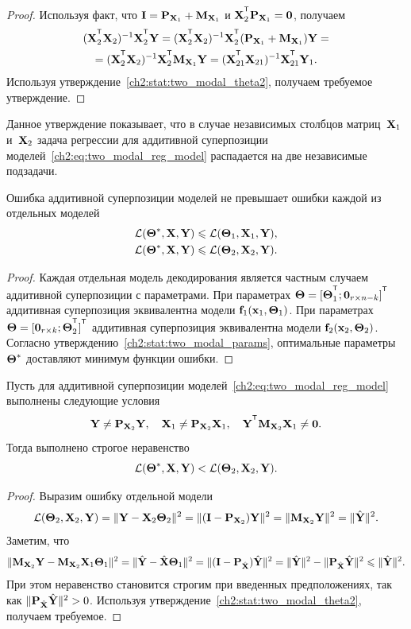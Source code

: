 \begin{proof}
	Используя факт, что $\mathbf{I} = \mathbf{P}_{\mathbf{X}_1} + \mathbf{M}_{\mathbf{X}_1}$ и $\bX_2^{\T} \bP_{\bX_1} = \bZero$, получаем
	\begin{multline*}
		(\bX_2^{\T} \bX_2)^{-1} \bX_2^{\T} \bY = (\bX_2^{\T} \bX_2)^{-1} \bX_2^{\T} (\bP_{\bX_1} + \bM_{\bX_1}) \bY = \\ = (\bX_2^{\T} \bX_2)^{-1} \bX_2^{\T} \bM_{\bX_1} \bY  = (\bX_{21}^{\T} \bX_{21})^{-1} \bX_{21}^{\T} \bY_1.
	\end{multline*}
	Используя утверждение~\ref{ch2:stat:two_modal_theta2}, получаем требуемое утверждение.
\end{proof}
Данное утверждение показывает, что в случае независимых столбцов матриц~$\mathbf{X}_1$ и~$\mathbf{X}_2$ задача регрессии для аддитивной суперпозиции моделей~\eqref{ch2:eq:two_modal_reg_model} распадается на две независимые подзадачи.

\begin{statement}
	Ошибка аддитивной суперпозиции моделей не превышает ошибки каждой из отдельных моделей
	\begin{align*}
		\mathcal{L}(\boldsymbol{\Theta}^*, \mathbf{X}, \mathbf{Y}) &\leqslant \mathcal{L}(\boldsymbol{\Theta}_1, \mathbf{X}_1, \mathbf{Y}), \\
		\mathcal{L}(\boldsymbol{\Theta}^*, \mathbf{X}, \mathbf{Y}) &\leqslant \mathcal{L}(\boldsymbol{\Theta}_2, \mathbf{X}_2, \mathbf{Y}).
	\end{align*}
\end{statement}
\begin{proof}
	Каждая отдельная модель декодирования является частным случаем аддитивной суперпозиции с параметрами. 
	При параметрах $\bTheta = [\bTheta_1^{\T}; \bZero_{r \times n - k}]^{\T}$ аддитивная суперпозиция эквивалентна модели $\mathbf{f}_1(\mathbf{x}_1, \boldsymbol{\Theta}_1)$.
	При параметрах $\bTheta = [\bZero_{r \times k}; \bTheta_2^{\T}]^{\T}$ аддитивная суперпозиция эквивалентна модели $\mathbf{f}_2(\mathbf{x}_2, \boldsymbol{\Theta}_2)$.
	Согласно утверждению~\ref{ch2:stat:two_modal_params}, оптимальные параметры $\boldsymbol{\Theta}^*$ доставляют минимум функции ошибки.
\end{proof}

\begin{statement}
	\label{ch2:stat:strict:two_model}
	Пусть для аддитивной суперпозиции моделей~\eqref{ch2:eq:two_modal_reg_model} выполнены следующие условия
	\[
		\bY \neq \bP_{\bX_2} \bY, \quad \bX_1 \neq \bP_{\bX_2} \bX_1, \quad \bY^{\T} \bM_{\bX_2} \bX_1 \neq \bZero.
	\]
	Тогда выполнено строгое неравенство
	\[
		\mathcal{L}(\boldsymbol{\Theta}^*, \mathbf{X}, \mathbf{Y}) < \mathcal{L}(\boldsymbol{\Theta}_2, \mathbf{X}_2, \mathbf{Y}).
	\]
\end{statement}
\begin{proof}
	Выразим ошибку отдельной модели
	\[
		\mathcal{L}(\boldsymbol{\Theta}_2, \mathbf{X}_2, \mathbf{Y}) = \| \mathbf{Y} - \mathbf{X}_2 \boldsymbol{\Theta}_2 \|^2 = \| (\mathbf{I} - \mathbf{P}_{\mathbf{X}_2}) \mathbf{Y} \|^2 = \| \mathbf{M}_{\mathbf{X}_2} \mathbf{Y} \|^2 = \| \hat{\mathbf{Y}} \|^2.
	\]	
	Заметим, что 
	\[
		\| \mathbf{M}_{\mathbf{X}_2} \mathbf{Y} - \mathbf{M}_{\mathbf{X}_2} \mathbf{X}_1 \boldsymbol{\Theta}_1 \|^2 = \| \hat{\mathbf{Y}} - \hat{\mathbf{X}} \boldsymbol{\Theta}_1 \|^2 = \| (\mathbf{I} - \mathbf{P}_{\hat{\mathbf{X}}}) \hat{\mathbf{Y}} \|^2 = \| \hat{\mathbf{Y}} \|^2 - \| \mathbf{P}_{\hat{\mathbf{X}}} \hat{\mathbf{Y}} \|^2 \leqslant \| \hat{\mathbf{Y}} \|^2.
	\]
	При этом неравенство становится строгим при введенных предположениях, так как $\| \mathbf{P}_{\hat{\mathbf{X}}} \hat{\mathbf{Y}} \|^2 > 0$.
	Используя утверждение~\ref{ch2:stat:two_modal_theta2}, получаем требуемое.
\end{proof}

